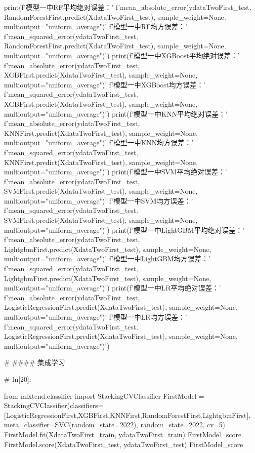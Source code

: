 \documentclass{MathorCupmodeling}
\begin{document}
\begin{python}
print(f'模型一中RF平均绝对误差：'
      f'{mean_absolute_error(ydataTwoFirst_test, RandomForestFirst.predict(XdataTwoFirst_test), sample_weight=None, multioutput="uniform_average")}\n'
      f'模型一中RF均方误差：'
      f'{mean_squared_error(ydataTwoFirst_test, RandomForestFirst.predict(XdataTwoFirst_test), sample_weight=None, multioutput="uniform_average")}')
print(f'模型一中XGBoost平均绝对误差：'
      f'{mean_absolute_error(ydataTwoFirst_test, XGBFirst.predict(XdataTwoFirst_test), sample_weight=None, multioutput="uniform_average")}\n'
      f'模型一中XGBoost均方误差：'
      f'{mean_squared_error(ydataTwoFirst_test, XGBFirst.predict(XdataTwoFirst_test), sample_weight=None, multioutput="uniform_average")}')
print(f'模型一中KNN平均绝对误差：'
      f'{mean_absolute_error(ydataTwoFirst_test, KNNFirst.predict(XdataTwoFirst_test), sample_weight=None, multioutput="uniform_average")}\n'
      f'模型一中KNN均方误差：'
      f'{mean_squared_error(ydataTwoFirst_test, KNNFirst.predict(XdataTwoFirst_test), sample_weight=None, multioutput="uniform_average")}')
print(f'模型一中SVM平均绝对误差：'
      f'{mean_absolute_error(ydataTwoFirst_test, SVMFirst.predict(XdataTwoFirst_test), sample_weight=None, multioutput="uniform_average")}\n'
      f'模型一中SVM均方误差：'
      f'{mean_squared_error(ydataTwoFirst_test, SVMFirst.predict(XdataTwoFirst_test), sample_weight=None, multioutput="uniform_average")}')
print(f'模型一中LightGBM平均绝对误差：'
      f'{mean_absolute_error(ydataTwoFirst_test, LightgbmFirst.predict(XdataTwoFirst_test), sample_weight=None, multioutput="uniform_average")}\n'
      f'模型一中LightGBM均方误差：'
      f'{mean_squared_error(ydataTwoFirst_test, LightgbmFirst.predict(XdataTwoFirst_test), sample_weight=None, multioutput="uniform_average")}')
print(f'模型一中LR平均绝对误差：'
      f'{mean_absolute_error(ydataTwoFirst_test, LogisticRegressionFirst.predict(XdataTwoFirst_test), sample_weight=None, multioutput="uniform_average")}\n'
      f'模型一中LR均方误差：'
      f'{mean_squared_error(ydataTwoFirst_test, LogisticRegressionFirst.predict(XdataTwoFirst_test), sample_weight=None, multioutput="uniform_average")}')


# #### 集成学习

# In[20]:


from mlxtend.classifier import StackingCVClassifier
FirstModel = StackingCVClassifier(classifiers=[LogisticRegressionFirst,XGBFirst,KNNFirst,RandomForestFirst,LightgbmFirst], meta_classifier=SVC(random_state=2022), random_state=2022, cv=5)
FirstModel.fit(XdataTwoFirst_train, ydataTwoFirst_train)
FirstModel_score = FirstModel.score(XdataTwoFirst_test, ydataTwoFirst_test)
FirstModel_score



\end{python}
\end{document}
